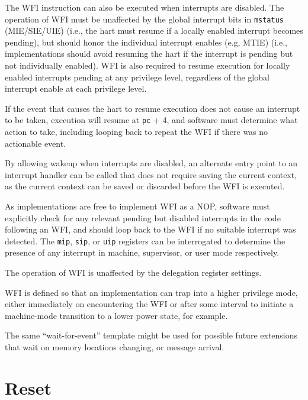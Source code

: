 The WFI instruction can also be executed when interrupts are disabled.
The operation of WFI must be unaffected by the global interrupt bits
in {\tt mstatus} (MIE/SIE/UIE) (i.e., the hart must resume if a
locally enabled interrupt becomes pending), but should honor the
individual interrupt enables (e.g, MTIE) (i.e., implementations should
avoid resuming the hart if the interrupt is pending but not
individually enabled).  WFI is also required to resume execution for
locally enabled interrupts pending at any privilege level, regardless
of the global interrupt enable at each privilege level.

If the event that causes the hart to resume execution does not cause
an interrupt to be taken, execution will resume at {\tt pc} + 4, and
software must determine what action to take, including looping back to
repeat the WFI if there was no actionable event.

\begin{commentary}
By allowing wakeup when interrupts are disabled, an alternate entry
point to an interrupt handler can be called that does not require
saving the current context, as the current context can be saved or
discarded before the WFI is executed.

As implementations are free to implement WFI as a NOP, software must
explicitly check for any relevant pending but disabled interrupts in
the code following an WFI, and should loop back to the WFI if no
suitable interrupt was detected.  The {\tt mip}, {\tt sip},
or {\tt uip} registers can be interrogated to determine the presence
of any interrupt in machine, supervisor, or user mode
respectively.

The operation of WFI is unaffected by the delegation register settings.

WFI is defined so that an implementation can trap into a higher
privilege mode, either immediately on encountering the WFI or after
some interval to initiate a machine-mode transition to a lower power
state, for example.
\end{commentary}

\begin{commentary}
The same ``wait-for-event'' template might be used for possible future
extensions that wait on memory locations changing, or message
arrival.
\end{commentary}

\section{Reset}
\label{sec:reset}

